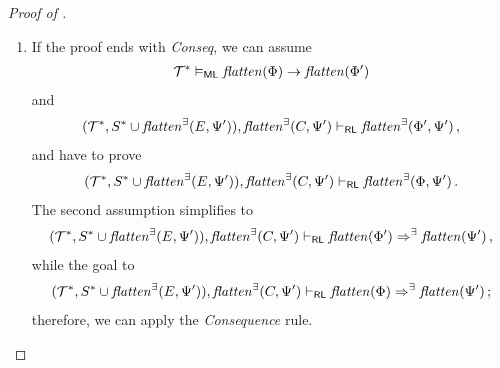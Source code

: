 \begin{proof}[Proof of ]
\begin{enumerate}
    \item If the proof ends with \emph{Conseq}, we can assume
    \begin{align*}
        \mathcal{T}^* \vDash_{\mathsf{ML}} \mathit{flatten}(\Phi) \rightarrow \mathit{flatten}(\Phi^\prime)
    \end{align*}
    and
    \begin{align*}
        (\mathcal{T}^*, S^* \cup \mathit{flatten}^\exists(E, \Psi^\prime)), \mathit{flatten}^\exists(C, \Psi^\prime) \vdash_{\mathsf{RL}}
          \mathit{flatten}^\exists(\Phi^\prime, \Psi^\prime) \, ,
    \end{align*}
    and have to prove
    \begin{align*}
        (\mathcal{T}^*, S^* \cup \mathit{flatten}^\exists(E, \Psi^\prime)), \mathit{flatten}^\exists(C, \Psi^\prime) \vdash_{\mathsf{RL}}
          \mathit{flatten}^\exists(\Phi, \Psi^\prime)  \, .
    \end{align*}
    The second assumption simplifies to
    \begin{align*}
        (\mathcal{T}^*, S^* \cup \mathit{flatten}^\exists(E, \Psi^\prime)), \mathit{flatten}^\exists(C, \Psi^\prime) \vdash_{\mathsf{RL}}
          \mathit{flatten}(\Phi^\prime) \Rightarrow^\exists \mathit{flatten}(\Psi^\prime) \, ,
    \end{align*}
    while the goal to
    \begin{align*}
        (\mathcal{T}^*, S^* \cup \mathit{flatten}^\exists(E, \Psi^\prime)), \mathit{flatten}^\exists(C, \Psi^\prime) \vdash_{\mathsf{RL}}
          \mathit{flatten}(\Phi) \Rightarrow^\exists \mathit{flatten}(\Psi^\prime) \, ;
    \end{align*}
    therefore, we can apply the \emph{Consequence} rule.        
        

\end{enumerate}
\end{proof}
